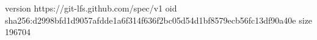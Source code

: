 version https://git-lfs.github.com/spec/v1
oid sha256:d2998bfd1d9057afdde1a6f314f636f2bc05d54d1bf8579ecb56fc13df90a40e
size 196704
